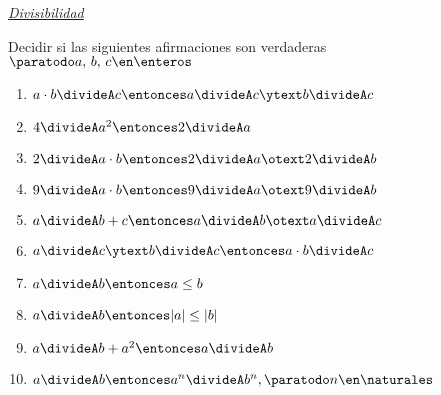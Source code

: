 \textit{\underline{Divisibilidad}}

\begin{enunciado}{\ejercicio}
  Decidir si las siguientes afirmaciones son verdaderas
  $\paratodo a,\, b,\, c \en \enteros$
  \begin{multicols}{2}
    \begin{enumerate}[label=\alph*)]
      \item $a \cdot b \divideA c \entonces a \divideA c  \ytext  b \divideA c$
      \item $4 \divideA a^2 \entonces 2 \divideA a $
      \item $2 \divideA a \cdot b \entonces 2 \divideA a  \otext 2 \divideA b$
      \item $9 \divideA a\cdot b \entonces 9 \divideA a   \otext  9 \divideA b$
      \item $a \divideA b + c \entonces a \divideA b  \otext  a \divideA c$
      \item $a \divideA c \ytext b \divideA c \entonces a \cdot b \divideA c$
      \item $a \divideA b \entonces a \leq b$
      \item $a \divideA b \entonces |a| \leq |b|$
      \item $a \divideA b + a^2 \entonces a \divideA b$
      \item $a \divideA b \entonces a^n \divideA b^n, \paratodo n \en \naturales$
    \end{enumerate}
  \end{multicols}
\end{enunciado}

